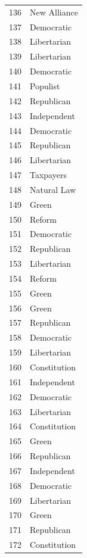 \documentclass[
  letterpaper,
  DIV=11,
  numbers=noendperiod]{scrreprt}
\begin{document}
\begin{tabular}{ll}
136 &           New Alliance \\
137 &             Democratic \\
138 &            Libertarian \\
139 &            Libertarian \\
140 &             Democratic \\
141 &               Populist \\
142 &             Republican \\
143 &            Independent \\
144 &             Democratic \\
145 &             Republican \\
146 &            Libertarian \\
147 &              Taxpayers \\
148 &            Natural Law \\
149 &                  Green \\
150 &                 Reform \\
151 &             Democratic \\
152 &             Republican \\
153 &            Libertarian \\
154 &                 Reform \\
155 &                  Green \\
156 &                  Green \\
157 &             Republican \\
158 &             Democratic \\
159 &            Libertarian \\
160 &           Constitution \\
161 &            Independent \\
162 &             Democratic \\
163 &            Libertarian \\
164 &           Constitution \\
165 &                  Green \\
166 &             Republican \\
167 &            Independent \\
168 &             Democratic \\
169 &            Libertarian \\
170 &                  Green \\
171 &             Republican \\
172 &           Constitution \\

\end{tabular}
\end{document}
